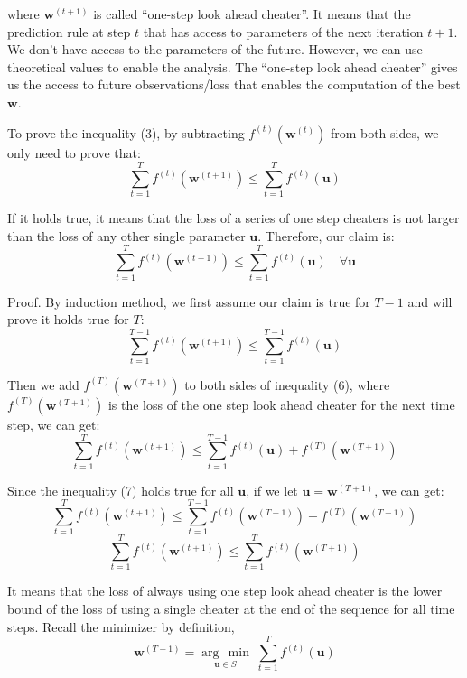 \documentclass[11pt]{article}
\newcommand{\argmin}[1]{\underset{#1}{\operatorname{arg}\,\operatorname{min}}\;}
\begin{document}
where $\bm{w}^{(t+1)}$ is called ``one-step look ahead cheater''. It means that the prediction rule at step $t$ that has access to parameters of the next iteration $t+1$. We don't have access to the parameters of the future. However, we can use theoretical values to enable the analysis. The ``one-step look ahead cheater'' gives us the access to future observations/loss that enables the computation of the best $\bm{w}$. 

To prove the inequality (3), by subtracting $f^{(t)}(\bm{w}^{(t)})$ from both sides, we only need to prove that:
\begin{equation}
    \sum_{t=1}^{T} f^{(t)}(\bm{w}^{(t+1)}) \leq \sum_{t=1}^{T}f^{(t)}(\bm{u})
\end{equation}

If it holds true, it means that the loss of a series of one step cheaters is not larger than the loss of any other single parameter $\bm{u}$. Therefore, our claim is:
\begin{equation}
    \sum_{t=1}^{T} f^{(t)}(\bm{w}^{(t+1)}) \leq \sum_{t=1}^{T}f^{(t)}(\bm{u}) \quad \forall \bm{u}
\end{equation}

Proof. By induction method, we first assume our claim is true for $T-1$ and will prove it holds true for $T$:
\begin{equation}
    \sum_{t=1}^{T-1} f^{(t)}(\bm{w}^{(t+1)}) \leq \sum_{t=1}^{T-1}f^{(t)}(\bm{u})
\end{equation}

Then we add $f^{(T)}(\bm{w}^{(T+1)})$ to both sides of inequality (6), where $f^{(T)}(\bm{w}^{(T+1)})$ is the loss of the one step look ahead cheater for the next time step, we can get:
\begin{equation}
    \sum_{t=1}^{T} f^{(t)}(\bm{w}^{(t+1)}) \leq \sum_{t=1}^{T-1}f^{(t)}(\bm{u}) + f^{(T)}(\bm{w}^{(T+1)})
\end{equation}

Since the inequality (7) holds true for all $\bm{u}$, if we let $\bm{u} = \bm{w}^{(T+1)}$, we can get:
\begin{equation}
    \sum_{t=1}^{T} f^{(t)}(\bm{w}^{(t+1)}) \leq \sum_{t=1}^{T-1}f^{(t)}(\bm{w}^{(T+1)}) + f^{(T)}(\bm{w}^{(T+1)})
\end{equation}
\begin{equation}
    \sum_{t=1}^{T} f^{(t)}(\bm{w}^{(t+1)}) \leq \sum_{t=1}^{T}f^{(t)}(\bm{w}^{(T+1)})
\end{equation}

It means that the loss of always using one step look ahead cheater is the lower bound of the loss of using a single cheater at the end of the
sequence for all time steps. Recall the minimizer by definition,
\begin{equation}
    \bm{w}^{(T+1)} = \argmin{\bm{u} \in S} \sum^{T}_{t=1} f^{(t)}(\bm{u})
\end{equation}
\end{document}
